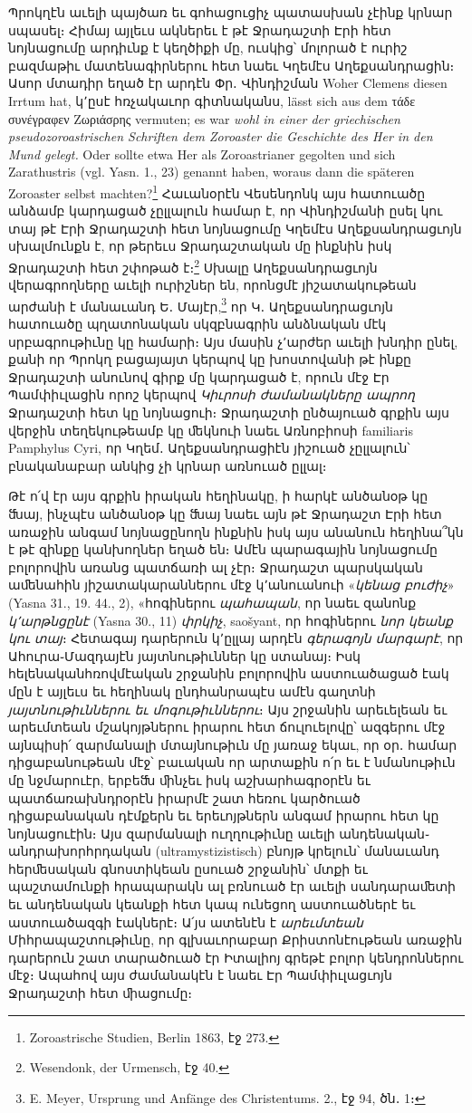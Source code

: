\documentclass{article}
\begin{document}
{Պրոկղէն աւելի պայծառ եւ գոհացուցիչ պատասխան չէինք կրնար սպասել։ Հիմայ այլեւս ակներեւ է թէ Ջրադաշտի Էրի հետ նոյնացումը արդիւնք է կեղծիքի մը, ուսկից՝ մոլորած է ուրիշ բազմաթիւ մատենագիրներու հետ նաեւ Կղեմէս Աղեքսանդրացին։ Ասոր մտադիր եղած էր արդէն Փր․ Վինդիշման Woher Clemens diesen Irrtum hat, կ՚ըսէ հռչակաւոր գիտնականս, lässt sich aus dem τάδε συνέγραφεν Ζωριάσρης vermuten; es war \emph{wohl in einer der griechischen pseudozoroastrischen Schriften dem Zoroaster die Geschichte des Her in den Mund gelegt.} Oder sollte etwa Her als Zoroastrianer gegolten und sich Zarathustris (vgl. Yasn. 1., 23) genannt haben, woraus dann die späteren Zoroaster selbst machten?\footnote{Zoroastrische Studien, Berlin 1863, էջ 273.} Հաւանօրէն Վեսենդոնկ այս հատուածը անձամբ կարդացած չըլլալուն համար է, որ Վինդիշմանի ըսել կու տայ թէ Էրի Ջրադաշտի հետ նոյնացումը Կղեմէս Աղեքսանդրացւոյն սխալմունքն է, որ թերեւս Ջրադաշտական մը ինքնին իսկ Ջրադաշտի հետ շփոթած է։\footnote{Wesendonk, der Urmensch, էջ 40.} Սխալը Աղեքսանդրացւոյն վերագրողները աւելի ուրիշներ են, որոնցմէ յիշատակութեան արժանի է մանաւանդ Ե․ Մայէր,\footnote{E. Meyer, Ursprung und Anfänge des Christentums. 2., էջ 94, ծն․ 1։} որ Կ․ Աղեքսանդրացւոյն հատուածը պղատոնական սկզբնագրին անձնական մէկ սրբագրութիւնը կը համարի։ Այս մասին չ՚արժեր աւելի խնդիր ընել, քանի որ Պրոկղ բացայայտ կերպով կը խոստովանի թէ ինքը Ջրադաշտի անունով գիրք մը կարդացած է, որուն մէջ Էր Պամփիւլացին որոշ կերպով \emph{Կիւրոսի ժամանակները ապրող} Ջրադաշտի հետ կը նոյնացուի։ Ջրադաշտի ընծայուած գրքին այս վերջին տեղեկութեամբ կը ﬔկնուի նաեւ Առնոբիոսի familiaris Pamphylus Cyri, որ Կղեմ․ Աղեքսանդրացիէն յիշուած չըլլալուն՝ բնականաբար անկից չի կրնար առնուած ըլլալ։

Թէ ո՛վ էր այս գրքին իրական հեղինակը, ի հարկէ անծանօթ կը ﬓայ, ինչպէս անծանօթ կը ﬓայ նաեւ այն թէ Ջրադաշտ Էրի հետ առաջին անգամ նոյնացընողն ինքնին իսկ այս անանուն հեղինա՞կն է թէ զինքը կանխողներ եղած են։ Ամէն պարագային նոյնացումը բոլորովին առանց պատճառի ալ չէր։ Ջրադաշտ պարսկական աﬔնահին յիշատակարաններու մէջ կ՚անուանուի «\emph{կենաց բուժիչ}» (Yasna 31., 19. 44., 2), «հոգիներու \emph{պահապան}, որ նաեւ զանոնք \emph{կ՚արթնցընէ} (Yasna 30., 11) \emph{փրկիչ}, saošyant, որ հոգիներու \emph{նոր կեանք կու տայ}։ Հետագայ դարերուն կ՚ըլլայ արդէն \emph{գերագոյն մարգարէ}, որ Ահուրա֊Մազդայէն յայտնութիւններ կը ստանայ։ Իսկ հելենականհռովմէական շրջանին բոլորովին աստուածացած էակ մըն է այլեւս եւ հեղինակ ընդհանրապէս ամէն գաղտնի \emph{յայտնութիւններու եւ մոգութիւններու}։ Այս շրջանին արեւելեան եւ արեւմտեան մշակոյթներու իրարու հետ ճուլուելովը՝ ազգերու մէջ այնպիսի՛ զարմանալի մտայնութիւն մը յառաջ եկաւ, որ օր․ համար դիցաբանութեան մէջ՝ բաւական որ արտաքին ո՛ր եւ է նմանութիւն մը նջմարուէր, երբեﬓ ﬕնչեւ իսկ աշխարհագրօրէն եւ պատճառախնդրօրէն իրարմէ շատ հեռու կարծուած դիցաբանական դէմքերն եւ երեւոյթներն անգամ իրարու հետ կը նոյնացուէին։ Այս զարմանալի ուղղութիւնը աւելի անդենական֊անդրախորհրդական (ultramystizistisch) բնոյթ կրելուն՝ մանաւանդ հերﬔսական գնոստիկեան ըսուած շրջանին՝ մտքի եւ պաշտամունքի հրապարակն ալ բռնուած էր աւելի սանդարաﬔտի եւ անդենական կեանքի հետ կապ ունեցող աստուածներէ եւ աստուածազգի էակներէ։ Ա՛յս ատենէն է \emph{արեւմտեան} Միհրապաշտութիւնը, որ գլխաւորաբար Քրիստոնէութեան առաջին դարերուն շատ տարածուած էր Իտալիոյ գրեթէ բոլոր կենդրոններու մէջ։ Ապահով այս ժամանակէն է նաեւ Էր Պամփիւլացւոյն Ջրադաշտի հետ ﬕացումը։

}
\end{document}
